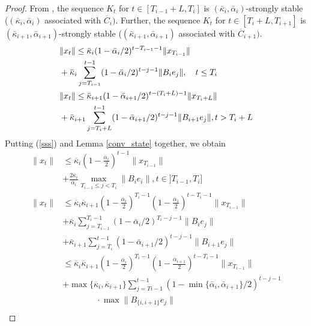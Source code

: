 \documentclass[letterpaper, 10 pt, conference]{ieeeconf}  %
\begin{document}
\begin{proof}
    From \cite{zhao2025policy}, the sequence $K_t$ for $t \in [T_{i-1}+L, T_{i}]$ is \((\bar{\kappa}_i, \bar{\alpha}_i)\)-strongly stable (\((\bar{\kappa}_i, \bar{\alpha}_i)\) associated with $\overline{C}_i)$. Further, the sequence $K_t$ for $t \in [T_i+L, T_{i+1}]$ is \((\bar{\kappa}_{i+1}, \bar{\alpha}_{i+1})\)-strongly stable (\((\bar{\kappa}_{i+1}, \bar{\alpha}_{i+1})\) associated with $\overline{C}_{i+1})$.
\begin{equation}
\label{sss}
    \begin{aligned}
        &\|x_t\| \leq \bar{\kappa}_i (1 - \bar{\alpha}_i/2)^{t-T_{i-1}-1} \|x_{T_{i-1}}\| \\ &+ \bar{\kappa}_i \sum_{j=T_{i-1}}^{t-1} (1 - \bar{\alpha}_i/2)^{t-j-1} \|B_ie_j\|, \quad t \leq T_i \\
        &\|x_t\| \leq \bar{\kappa}_{i+1}\vspace{-2em} (1 - \bar{\alpha}_{i+1}/2)^{t-(T_i+L)-1} \|x_{T_i+L}\| \\ & + \bar{\kappa}_{i+1} \sum_{j=T_i+L}^{t-1} (1 - \bar{\alpha}_{i+1}/2)^{t-j-1} \|B_{i+1}e_j\|, t > T_i + L
    \end{aligned}
\end{equation}
Putting (\ref{sss}) and Lemma \ref{conv_state} together, we obtain
\begin{align*}
    \|x_t\| &\leq \overline{\kappa}_i (1-\frac{\overline{\alpha}_i}{2})^{t-1}\|x_{T_{i-1}}\| \\ &+\frac{2\overline{\kappa}_i}{\overline{\alpha}_i} \underset{T_{i-1}\leq j < T_i}{\max} \|B_i e_i\|, t \in ]T_{i-1}, T_i] \\
    \|x_t\| &\leq \overline{\kappa}_i \overline{\kappa}_{i+1} (1-\frac{\overline{\alpha}_i}{2})^{T_i-1}(1-\frac{\overline{\alpha}_1}{2})^{t-T_i-1}\|x_{T_{i-1}}\| \\ &+ \bar{\kappa}_i \sum_{j=T_{i-1}}^{T_i-1} (1 - \bar{\alpha}_i/2)^{T_i-j-1} \|B_ie_j\| \\ &+\bar{\kappa}_{i+1} \sum_{j=T_i}^{t-1} (1 - \bar{\alpha}_{i+1}/2)^{t-j-1} \|B_{i+1}e_j\| \\
    &\leq \overline{\kappa}_i \overline{\kappa}_{i+1} (1-\frac{\overline{\alpha}_i}{2})^{T_i-1}(1-\frac{\overline{\alpha}_{i+1}}{2})^{t-T_i-1}\|x_{T_{i-1}}\| \\ &+ \max \{\overline{\kappa}_i, \overline{\kappa}_{i+1}\} \sum_{j=T{i-1}}^{t-1} (1 - \min \{\bar{\alpha}_i, \bar{\alpha}_{i+1}\}/2)^{t-j-1} \\
    &\quad\quad\quad\quad \cdot \max\|B_{\{i,i+1\}}e_j\| \\

\end{align*}
\end{proof}
\end{document}
